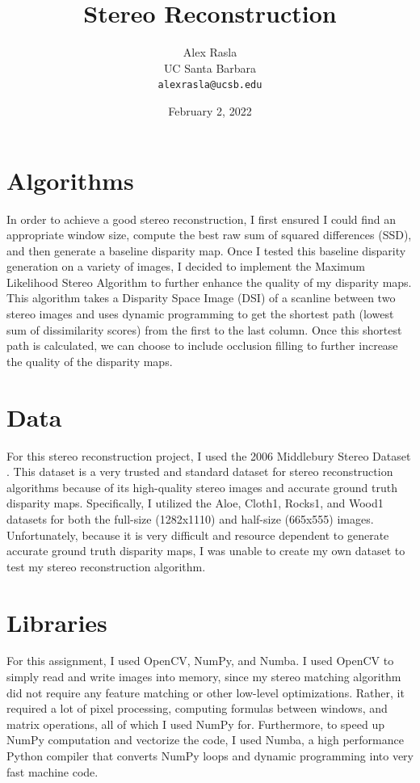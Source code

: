\documentclass[11pt,a4paper]{article}
\title{Stereo Reconstruction}
\author{Alex Rasla \\
  UC Santa Barbara \\
  \texttt{alexrasla@ucsb.edu}}
\date{February 2, 2022}
\begin{document}
\maketitle

\section{Algorithms}

In order to achieve a good stereo reconstruction, I first ensured I could find an appropriate 
 window size, compute the best raw sum of squared differences (SSD), and then generate a baseline disparity map. 
 Once I tested this baseline disparity generation on a variety of images, I decided to implement the Maximum Likelihood Stereo 
 Algorithm \cite{COX1996542} to further enhance the quality of my disparity maps. This algorithm takes a Disparity Space Image (DSI) of a scanline between two stereo images and 
 uses dynamic programming to get the shortest path (lowest sum of dissimilarity scores) from the first to the last column. 
 Once this shortest path is calculated, we can choose to include occlusion filling to further increase the quality of the disparity maps.

\section{Data}

For this stereo reconstruction project, I used the 2006 Middlebury Stereo Dataset \cite{Hirschmller2007EvaluationOC}. 
 This dataset is a very trusted and standard dataset for stereo reconstruction algorithms because of its high-quality stereo 
 images and accurate ground truth disparity maps. Specifically, I utilized the Aloe, Cloth1, Rocks1, and Wood1 datasets for 
 both the full-size (1282x1110) and half-size (665x555) images.  Unfortunately, because it is very difficult and resource 
 dependent to generate accurate ground truth disparity maps, I was unable to create my own dataset to test my stereo reconstruction 
 algorithm.

\section{Libraries}

For this assignment, I used OpenCV, NumPy, and Numba. I used OpenCV to simply read and write images into memory, 
 since my stereo matching algorithm did not require any feature matching or other low-level optimizations. Rather, 
 it required a lot of pixel processing, computing formulas between windows, and matrix operations, all of which I used NumPy for.
 Furthermore, to speed up NumPy computation and vectorize the code, I used Numba, a high performance Python compiler that converts 
 NumPy loops and dynamic programming into very fast machine code.
\end{document}

